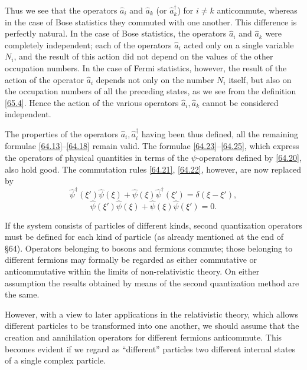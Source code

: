 Thus we see that the operators $ \hat{a}_i $ and $ \hat{a}_k $ (or $\hat{a}_k^\dagger$) for $ i\ne k $ anticommute, whereas in the case of Bose statistics they commuted with one another. This difference is perfectly natural. In the case of Bose statistics, the operators $\hat{a}_i$ and $\hat{a}_k$ were completely independent; each of the operators $\hat{a}_i$ acted only on a single variable $ N_i $, and the result of this action did not depend on the values of the other occupation numbers. In the case of Fermi statistics, however, the result of the action of the operator $\hat{a}_i$ depends not only on the number $ N_i $ itself, but also on the occupation numbers of all the preceding states, as we see from the definition \eqref{65.4}. Hence the action of the various operators $ \hat{a}_i,\hat{a}_k $ cannot be considered independent.

The properties of the operators $ \hat{a}_i,\hat{a}_i^\dagger $ having been thus defined, all the remaining formulae \eqref{64.13}--\eqref{64.18} remain valid. The formulae \eqref{64.23}--\eqref{64.25}, which express the operators of physical quantities in terms of the $\psi$-operators defined by \eqref{64.20}, also hold good. The commutation rules \eqref{64.21}, \eqref{64.22}, however, are now replaced by
\begin{equation}\label{65.11}
\hat{\psi}^\dagger(\xi')\hat{\psi}(\xi)+\hat{\psi}(\xi)\hat{\psi}^\dagger(\xi')=\delta(\xi-\xi'),
\end{equation}
\begin{equation}\label{65.12}
\hat{\psi}(\xi')\hat{\psi}(\xi)+\hat{\psi}(\xi)\hat{\psi}(\xi')=0.
\end{equation}





If the system consists of particles of different kinds, second quantization operators must be defined for each kind of particle (as already mentioned at the end of §64). Operators belonging to bosons and fermions commute; those belonging to different fermions may formally be regarded as either commutative or anticommutative within the limits of non-relativistic theory. On either assumption the results obtained by means of the second quantization method are the same.

However, with a view to later applications in the relativistic theory, which allows different particles to be transformed into one another, we should assume that the creation and annihilation operators for different fermions anticommute. This becomes evident if we regard as “different” particles two different internal states of a single complex particle.









